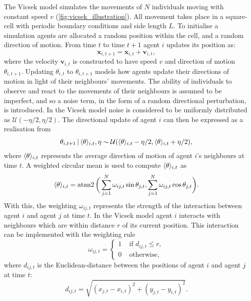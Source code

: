 The Vicsek model simulates the movements of $N$ individuals moving with
constant speed $v$ (\cref{fig:vicsek_illustration}). All movement takes place
in a square-cell with periodic boundary conditions and side length $L$. To
initialise a simulation agents are allocated a random position within the cell,
and a random direction of motion. From time $t$ to time $t+1$ agent $i$ updates
its position as:
\begin{equation*}
    \bm{x}_{i, t+1} = \bm{x}_{i, t} + \bm{v}_{i, t},
\end{equation*}
where the velocity $\bm{v}_{i,t}$ is constructed to have speed $v$ and
direction of motion $\theta_{i, t+1}$. Updating $\theta_{i,t}$ to $\theta_{i,
t+1}$ models how agents update their directions of motion in light of their
neighbours' movements. The ability of individuals to observe and react to the
movements of their neighbours is assumed to be imperfect, and so a noise term,
in the form of a random directional perturbation, is introduced. In the Vicsek
model noise is considered to be uniformly distributed as $\mathcal{U}(-\eta/2,
\eta/2)$. The directional update of agent $i$ can then be expressed as a
realisation from
\begin{equation}
    \label{eq:vicsek_update}
    \theta_{i, t+1} \,|\, \langle\theta\rangle_{i, t}, \eta \sim
                   \mathcal{U}(\langle\theta\rangle_{i, t} - \eta/2,
                               \langle\theta\rangle_{i, t} + \eta/2),
\end{equation}
where $\langle\theta\rangle_{i, t}$ represents the average direction of motion of
agent $i$'s neighbours at time $t$. A weighted circular mean is used to
compute $\langle\theta\rangle_{i, t}$ as
\begin{equation}
    \langle\theta\rangle_{i, t} = \operatorname{atan2}\bigg(
        \sum_{j=1}^N \omega_{ij, t} \sin\theta_{j,t},
        \sum_{j=1}^N \omega_{ij, t} \cos\theta_{j,t}
    \bigg).
\end{equation}
With this, the weighting $\omega_{ij, t}$ represents the strength of the
interaction between agent $i$ and agent $j$ at time $t$. In the Vicsek model
agent $i$ interacts with neighbours which are within distance $r$ of its
current position. This interaction can be implemented with the weighting rule
\begin{equation}
    \label{eq:vicsek_interaction}
    \omega_{ij,t} =
    \begin{cases}
        1 & \text{ if } d_{ij, t} \leq r,\\
        0 & \text{ otherwise,}
    \end{cases}
\end{equation}
where $d_{ij,t}$ is the Euclidean-distance between the positions of agent $i$
and agent $j$ at time $t$:
\begin{equation*}
    d_{ij,t} = \sqrt{(x_{j,t} - x_{i,t})^2 + (y_{j,t} - y_{i,t})^2}.
\end{equation*}


